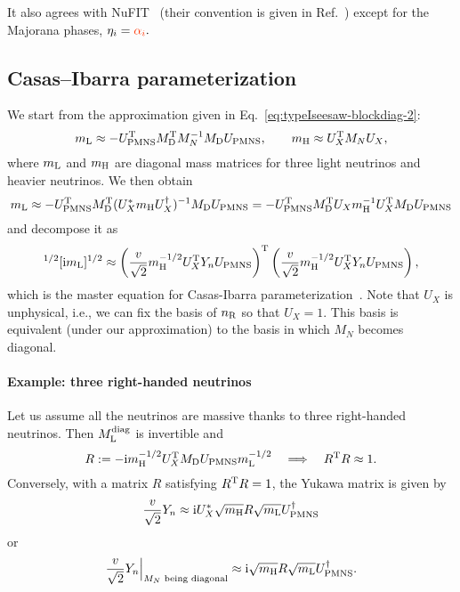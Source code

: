 \documentclass[CheatSheet]{subfiles}
\begin{document}
It also agrees with NuFIT~\cite[v5.0]{NUFIT} (their convention is given in Ref.~\cite{Esteban:2018azc}) except for the Majorana phases,
$
 \eta_i = \C{\alpha_i}.
$



\subsection{Casas--Ibarra parameterization}
We start from the approximation given in Eq.~\eqref{eq:typeIseesaw-blockdiag-2}:
\begin{equation}
 m\w L \approx -U\w{PMNS}^\TT M\w{D}^\TT M_N^{-1}M\w{D} U\w{PMNS},\qquad
 m\w H \approx U_X^\TT M_N U_X,
\end{equation}
where $m\w L$ and $m\w H$ are diagonal mass matrices for three light neutrinos and heavier neutrinos.
We then obtain
\begin{equation}
  m\w L
\approx -U\w{PMNS}^\TT M\w{D}^\TT (U_X^* m\w H U_X^\dagger)^{-1}M\w{D} U\w{PMNS}
=       -U\w{PMNS}^\TT M\w{D}^\TT U_Xm\w H^{-1}U_X^\TT M\w{D} U\w{PMNS}
\end{equation}
and decompose it as
\begin{equation}
   [\ii m\w L]^{1/2}[\ii m\w L]^{1/2}
\approx     \left(\frac{v}{\sqrt2}m\w H^{-1/2}U_X^\TT Y_n U\w{PMNS}\right)^{\TT} \left(\frac{v}{\sqrt2} m\w H^{-1/2}U_X^\TT Y_n U\w{PMNS}\right),
\end{equation}
which is the master equation for Casas-Ibarra parameterization~\cite{Casas:2001sr}.
Note that $U_X$ is unphysical, i.e., we can fix the basis of $n_{\mathrm{R}}$ so that $U_X=1$.
This basis is equivalent (under our approximation) to the basis in which $M_N$ becomes diagonal.

\paragraph{Example: three right-handed neutrinos}
Let us assume all the neutrinos are massive thanks to three right-handed neutrinos. Then $M\w L\wdiag$ is invertible and
\begin{equation}
 R:=-\ii m\w H^{-1/2}U_X^\TT M\w{D}  U\w{PMNS}  m\w L^{-1/2}
\quad\Longrightarrow\quad R^\TT R\approx1.
\end{equation}
Conversely, with a matrix $R$ satisfying $R^{\mathrm{T}} R=1$, the Yukawa matrix is given by
\begin{equation}
 \frac{v}{\sqrt2}Y_n
  \approx \ii U_X^*\sqrt{m\w H}R\sqrt{m\w L}U\w{PMNS}^\dagger
\end{equation}
or
\begin{equation}
 \frac{v}{\sqrt2}Y_n\Big|\w*{$M_N$ being diagonal}
  \approx \ii \sqrt{m\w H}R\sqrt{m\w L}U\w{PMNS}^\dagger.
\end{equation}
\end{document}
